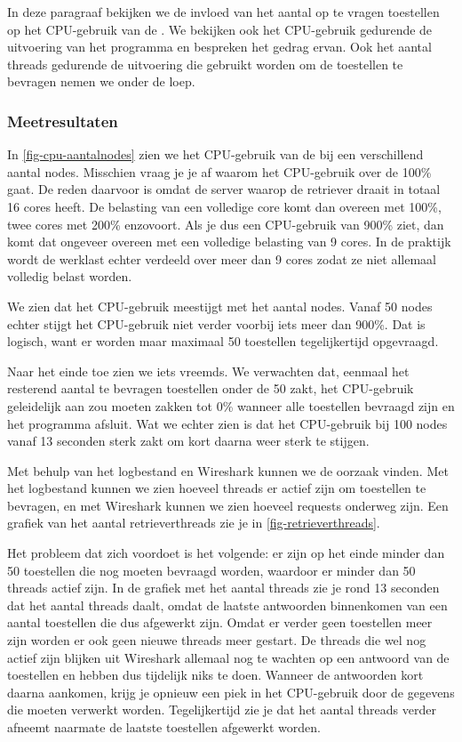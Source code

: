 In deze paragraaf bekijken we de invloed van het aantal op te vragen toestellen op het CPU-gebruik van de \nwmretriever{}.
We bekijken ook het CPU-gebruik gedurende de uitvoering van het programma en bespreken het gedrag ervan.
Ook het aantal threads gedurende de uitvoering die gebruikt worden om de toestellen te bevragen nemen we onder de loep.

\subsubsection{Meetresultaten}

In \cref{fig-cpu-aantalnodes} zien we het CPU-gebruik van de \nwmretriever{} bij een verschillend aantal nodes.
Misschien vraag je je af waarom het CPU-gebruik over de 100\% gaat.
De reden daarvoor is omdat de server waarop de retriever draait in totaal 16 cores heeft.
De belasting van een volledige core komt dan overeen met 100\%, twee cores met 200\% enzovoort.
Als je dus een CPU-gebruik van 900\% ziet, dan komt dat ongeveer overeen met een volledige belasting van 9 cores.
In de praktijk wordt de werklast echter verdeeld over meer dan 9 cores zodat ze niet allemaal volledig belast worden.

We zien dat het CPU-gebruik meestijgt met het aantal nodes.
Vanaf 50 nodes echter stijgt het CPU-gebruik niet verder voorbij iets meer dan 900\%.
Dat is logisch, want er worden maar maximaal 50 toestellen tegelijkertijd opgevraagd.

Naar het einde toe zien we iets vreemds.
We verwachten dat, eenmaal het resterend aantal te bevragen toestellen onder de 50 zakt,
het CPU-gebruik geleidelijk aan zou moeten zakken tot 0\% wanneer alle toestellen bevraagd zijn en het programma afsluit.
Wat we echter zien is dat het CPU-gebruik bij 100 nodes vanaf 13 seconden sterk zakt om kort daarna weer sterk te stijgen.

Met behulp van het logbestand en Wireshark kunnen we de oorzaak vinden.
Met het logbestand kunnen we zien hoeveel threads er actief zijn om toestellen te bevragen,
en met Wireshark kunnen we zien hoeveel requests onderweg zijn.
Een grafiek van het aantal retrieverthreads zie je in \cref{fig-retrieverthreads}.

Het probleem dat zich voordoet is het volgende:
er zijn op het einde minder dan 50 toestellen die nog moeten bevraagd worden, waardoor er minder dan 50 threads actief zijn.
In de grafiek met het aantal threads zie je rond 13 seconden dat het aantal threads daalt,
omdat de laatste antwoorden binnenkomen van een aantal toestellen die dus afgewerkt zijn.
Omdat er verder geen toestellen meer zijn worden er ook geen nieuwe threads meer gestart.
De threads die wel nog actief zijn blijken uit Wireshark allemaal nog te wachten op een antwoord van de toestellen en hebben dus tijdelijk niks te doen.
Wanneer de antwoorden kort daarna aankomen, krijg je opnieuw een piek in het CPU-gebruik door de gegevens die moeten verwerkt worden.
Tegelijkertijd zie je dat het aantal threads verder afneemt naarmate de laatste toestellen afgewerkt worden.

